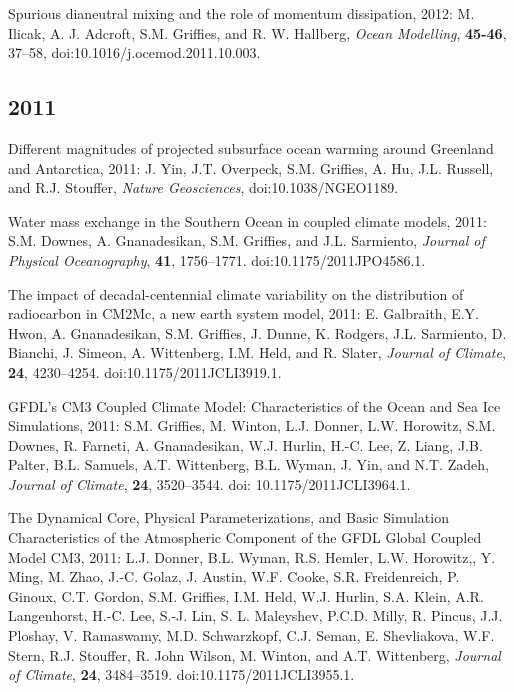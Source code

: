 \begin{etaremune}
\item Spurious dianeutral mixing and the role of momentum dissipation, 2012: M. Ilicak, A. J. Adcroft, S.M. Grif\/f\/ies, and  R. W. Hallberg, {\it Ocean Modelling}, {\bf 45-46}, 37--58,  doi:10.1016/j.ocemod.2011.10.003.

\subsection*{\sc \color{Maroon} 2011}

\item Different magnitudes of projected subsurface ocean warming  around Greenland and Antarctica, 2011: J. Yin, J.T. Overpeck, S.M. Grif\/f\/ies, A. Hu, J.L. Russell, and R.J. Stouffer, {\it  Nature Geosciences}, doi:10.1038/NGEO1189.

\item Water mass exchange in the Southern Ocean in coupled climate  models, 2011: S.M. Downes, A. Gnanadesikan, S.M. Grif\/f\/ies,  and J.L. Sarmiento, {\it Journal of Physical Oceanography}, {\bf
    41}, 1756--1771.  doi:10.1175/2011JPO4586.1.

\item The impact of decadal-centennial climate variability on the  distribution of radiocarbon in CM2Mc, a new earth system model,  2011: E. Galbraith, E.Y. Hwon, A. Gnanadesikan, S.M. Grif\/f\/ies, J. Dunne, K. Rodgers, J.L. Sarmiento, D. Bianchi, J. Simeon, A. Wittenberg, I.M. Held, and R.  Slater, {\it Journal of Climate}, {\bf 24}, 4230--4254. doi:10.1175/2011JCLI3919.1.

\item GFDL's CM3 Coupled Climate Model: Characteristics of the Ocean  and Sea Ice Simulations, 2011: S.M. Grif\/f\/ies, M. Winton,  L.J. Donner, L.W. Horowitz, S.M. Downes, R.  Farneti,  A. Gnanadesikan, W.J. Hurlin, H.-C. Lee, Z. Liang, J.B. Palter,  B.L. Samuels, A.T. Wittenberg, B.L. Wyman, J.  Yin, and N.T. Zadeh,
  {\it Journal of Climate}, {\bf 24}, 3520--3544.  doi:
  10.1175/2011JCLI3964.1.

\item The Dynamical Core, Physical Parameterizations, and Basic Simulation Characteristics of the Atmospheric Component of the GFDL Global Coupled Model CM3, 2011: L.J. Donner, B.L. Wyman, R.S. Hemler, L.W. Horowitz,, Y. Ming, M. Zhao, J.-C. Golaz, J. Austin, W.F. Cooke, S.R. Freidenreich, P. Ginoux, C.T. Gordon, S.M. Grif\/f\/ies, I.M. Held, W.J. Hurlin, S.A. Klein, A.R. Langenhorst, H.-C. Lee, S.-J. Lin, S. L. Maleyshev, P.C.D. Milly, R. Pincus, J.J. Ploshay, V. Ramaswamy, M.D. Schwarzkopf, C.J. Seman, E. Shevliakova, W.F. Stern, R.J. Stouﬀer, R. John Wilson, M.  Winton, and A.T. Wittenberg, {\it Journal of Climate}, {\bf 24}, 3484--3519. 
  doi:10.1175/2011JCLI3955.1.


\end{etaremune}
